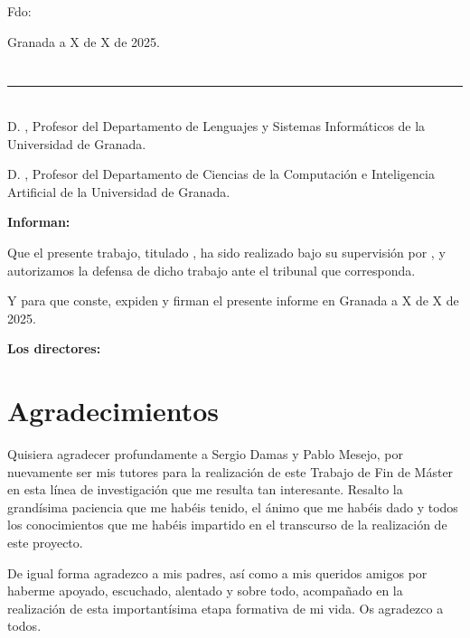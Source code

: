 \vspace{6cm}

\noindent Fdo: \myName

\vspace{2cm}

\begin{flushright}
Granada a X de X de 2025.
\end{flushright}


\chapter*{}
\thispagestyle{empty}

\noindent\rule[-1ex]{\textwidth}{2pt}\\[4.5ex]

D. \textbf{\myProf}, Profesor del Departamento de Lenguajes y Sistemas Informáticos de la Universidad de Granada.

\vspace{0.25cm}

D. \textbf{\myOtherProf}, Profesor del Departamento de Ciencias de la Computación e Inteligencia Artificial de la Universidad de Granada.


\vspace{0.25cm}

\textbf{Informan:}

\vspace{0.25cm}

Que el presente trabajo, titulado \textit{\textbf{\myTitle}},
ha sido realizado bajo su supervisión por \textbf{\myName}, y autorizamos la defensa de dicho trabajo ante el tribunal
que corresponda.

\vspace{0.5cm}

Y para que conste, expiden y firman el presente informe en Granada a X de X de 2025.

\vspace{0.5cm}

\textbf{Los directores:}

\vspace{5cm}

\noindent \textbf{\myProf \hfill
\myOtherProf}

\chapter*{Agradecimientos}
\thispagestyle{empty}

\vspace{1cm}

Quisiera agradecer profundamente a Sergio Damas y Pablo Mesejo, por nuevamente ser mis tutores para la realización de este Trabajo de Fin de Máster en esta línea de investigación que me resulta tan interesante. Resalto la grandísima paciencia que me habéis tenido, el ánimo que me habéis dado y todos los conocimientos que me habéis impartido en el transcurso de la realización de este proyecto.

De igual forma agradezco a mis padres, así como a mis queridos amigos por haberme apoyado, escuchado, alentado y sobre todo, acompañado en la realización de esta importantísima etapa formativa de mi vida. Os agradezco a todos.